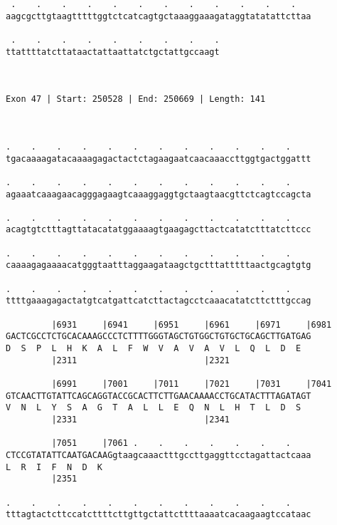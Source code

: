 \documentclass{article}
\begin{document}
\begin{Verbatim}
 .    .    .    .    .    .    .    .    .    .    .    .   
aagcgcttgtaagtttttggtctcatcagtgctaaaggaaagataggtatatattcttaa
                                                            
 .    .    .    .    .    .    .    .    .
ttattttatcttataactattaattatctgctattgccaagt
                                          
                                          
 
Exon 47 | Start: 250528 | End: 250669 | Length: 141



.    .    .    .    .    .    .    .    .    .    .    .    
tgacaaaagatacaaaagagactactctagaagaatcaacaaaccttggtgactggattt
                                                            
.    .    .    .    .    .    .    .    .    .    .    .    
agaaatcaaagaacagggagaagtcaaaggaggtgctaagtaacgttctcagtccagcta
                                                            
.    .    .    .    .    .    .    .    .    .    .    .    
acagtgtctttagttatacatatggaaaagtgaagagcttactcatatctttatcttccc
                                                            
.    .    .    .    .    .    .    .    .    .    .    .    
caaaagagaaaacatgggtaatttaggaagataagctgctttatttttaactgcagtgtg
                                                            
.    .    .    .    .    .    .    .    .    .    .    .    
ttttgaaagagactatgtcatgattcatcttactagcctcaaacatatcttctttgccag
                                                            
         |6931     |6941     |6951     |6961     |6971     |6981
GACTCGCCTCTGCACAAAGCCCTCTTTTGGGTAGCTGTGGCTGTGCTGCAGCTTGATGAG
D  S  P  L  H  K  A  L  F  W  V  A  V  A  V  L  Q  L  D  E  
         |2311                         |2321                
  
         |6991     |7001     |7011     |7021     |7031     |7041
GTCAACTTGTATTCAGCAGGTACCGCACTTCTTGAACAAAACCTGCATACTTTAGATAGT
V  N  L  Y  S  A  G  T  A  L  L  E  Q  N  L  H  T  L  D  S  
         |2331                         |2341                
  
         |7051     |7061 .    .    .    .    .    .    .    
CTCCGTATATTCAATGACAAGgtaagcaaactttgccttgaggttcctagattactcaaa
L  R  I  F  N  D  K                                         
         |2351                                              
  
.    .    .    .    .    .    .    .    .    .    .    .    
tttagtactcttccatcttttcttgttgctattcttttaaaatcacaagaagtccataac
                                                            

\end{Verbatim}
\end{document}
